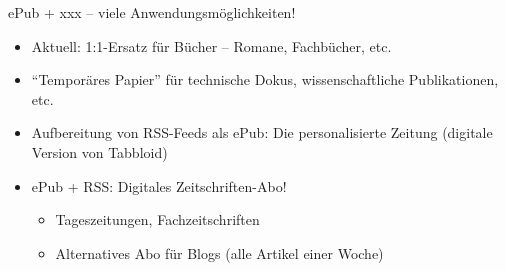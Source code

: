 \begin{frame}{ePub + xxx -- viele Anwendungsmöglichkeiten!}
	\begin{itemize}
		\item Aktuell: 1:1-Ersatz für Bücher -- Romane, Fachbücher, etc.
		\item "`Temporäres Papier"' für technische Dokus, wissenschaftliche Publikationen, etc.
		\item<2-> Aufbereitung von RSS-Feeds als ePub: Die personalisierte Zeitung (digitale Version von Tabbloid)
		\item<3-> ePub + RSS: Digitales Zeitschriften-Abo!
		\begin{itemize}
			\item Tageszeitungen, Fachzeitschriften
			\item Alternatives Abo für Blogs (alle Artikel einer Woche)
		\end{itemize}
	\end{itemize}
\end{frame}

